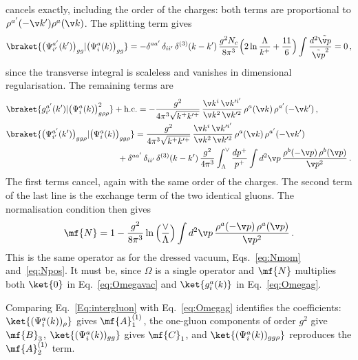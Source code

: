 cancels exactly, including the order of the charges: both terms are proportional to
$\rho^{a'}(-\v k')\rho^{a}(\v k)$. The splitting term gives
\begin{align}
\braket{\big(\Psi^{a'}_{i'}(k')\big)_{gg}|\big(\Psi^{a}_{i}(k)\big)_{gg}}
=-\delta^{aa'}\,\delta_{ii'}\,\delta^{(3)}(k-k')\,\frac{g^{2}N_{c}}{8\pi^{3}}
\Big(2\ln\frac{\Lambda}{k^{+}}+\frac{11}{6}\Big)\int\frac{d^{2}\tilde{\v p}}{\tilde{\v p}^{2}}=0\,,
\end{align}
since the transverse integral is scaleless and vanishes in dimensional regularisation. The remaining
terms are
\begin{align}
&\braket{g^{a'}_{i'}(k')|\big(\Psi^{a}_{i}(k)\big)^{2}_{g\rho\rho}}+{\rm h.c.}
=-\frac{g^{2}}{4\pi^{3}\sqrt{k^{+}k'^{+}}}\,\frac{\v k^{i}\,\v k'^{i'}}{\v k^{2}\,\v k'^{2}}\,
\rho^{a}(\v k)\,\rho^{a'}(-\v k')\,,\notag\\
&\braket{\big(\Psi^{a'}_{i'}(k')\big)_{gg\rho}|\big(\Psi^{a}_{i}(k)\big)_{gg\rho}}
=\frac{g^{2}}{4\pi^{3}\sqrt{k^{+}k'^{+}}}\,\frac{\v k^{i}\,\v k'^{i'}}{\v k^{2}\,\v k'^{2}}\,
\rho^{a}(\v k)\,\rho^{a'}(-\v k')\notag\\
&\hspace{4.6cm}+\delta^{aa'}\,\delta_{ii'}\,\delta^{(3)}(k-k')\,\frac{g^{2}}{4\pi^{3}}
\int_{\Lambda}^{\vee}\frac{dp^{+}}{p^{+}}\int d^{2}\v p\,\frac{\rho^{b}(-\v p)\,\rho^{b}(\v p)}{\v p^{2}}\,.
\end{align}
The first terms cancel, again with the same order of the charges. The second term of the last line is
the exchange term of the two identical gluons. The normalisation condition then gives
\begin{align}\label{eq:Nonegluon}
\mf{N}=1-\frac{g^{2}}{8\pi^{3}}\ln\Big(\frac{\vee}{\Lambda}\Big)\int d^{2}\v p\,\frac{\rho^{a}(-\v p)\,\rho^{a}(\v p)}{\v p^{2}}\,.
\end{align}
This is the same operator as for the dressed vacuum, Eqs.~\eqref{eq:Nmom} and~\eqref{eq:Npos}. It must
be, since $\Omega$ is a single operator and $\mf{N}$ multiplies both $\ket{0}$ in Eq.~\eqref{eq:Omegavac}
and $\ket{g^{a}_{i}(k)}$ in Eq.~\eqref{eq:Omegag}.

Comparing Eq.~\eqref{Eq:intergluon} with Eq.~\eqref{eq:Omegag} identifies the coefficients:
$\ket{(\Psi^{a}_{i}(k))_{\rho}}$ gives $\mf{A}^{(1)}_{1}$, the one-gluon components of order $g^{2}$ give
$\mf{B}_{3}$, $\ket{(\Psi^{a}_{i}(k))_{gg}}$ gives $\mf{C}_{1}$, and $\ket{(\Psi^{a}_{i}(k))_{gg\rho}}$
reproduces the $\mf{A}^{(1)}_{2}$ term.
